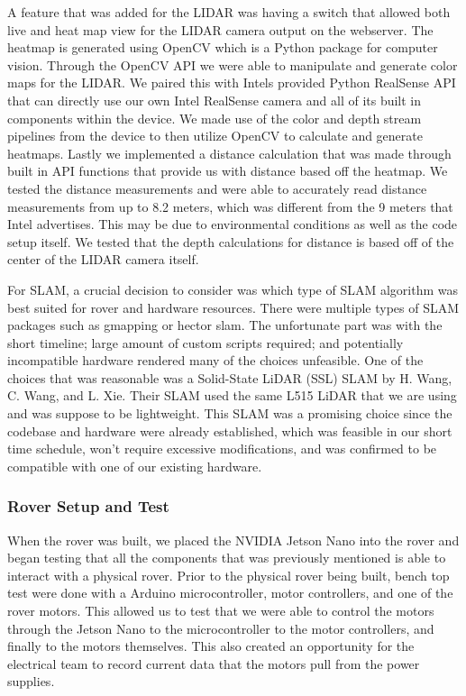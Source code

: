 \documentclass[a4paper, 10pt]{article}
\begin{document}
    A feature that was added for the LIDAR was having a switch that allowed both live and heat map view for the LIDAR camera output on the webserver. The heatmap is generated using OpenCV which is a Python package for computer vision. Through the OpenCV API we were able to manipulate and generate color maps for the LIDAR. We paired this with Intels provided Python RealSense API that can directly use our own Intel RealSense camera and all of its built in components within the device. We made use of the color and depth stream pipelines from the device to then utilize OpenCV to calculate and generate heatmaps. 
    Lastly we implemented a distance calculation that was made through built in API functions that provide us with distance based off the heatmap. 
    We tested the distance measurements and were able to accurately read distance measurements from up to 8.2 meters, which was different from the 9 meters that Intel advertises. This may be due to environmental conditions as well as the code setup itself. We tested that the depth calculations for distance is based off of the center of the LIDAR camera itself.
    
    For SLAM, a crucial decision to consider was which type of SLAM algorithm was best suited for rover and hardware resources. There were multiple types of SLAM packages such as gmapping or hector slam. The unfortunate part was with the short timeline; large amount of custom scripts required; and potentially incompatible hardware rendered many of the choices unfeasible. One of the choices that was reasonable was a Solid-State LiDAR (SSL) SLAM by H. Wang, C. Wang, and L. Xie. Their SLAM used the same L515 LiDAR that we are using and was suppose to be lightweight. This SLAM was a promising choice since the codebase and hardware were already established, which was feasible in our short time schedule, won't require excessive modifications, and was confirmed to be compatible with one of our existing hardware. 

    \subsubsection*{Rover Setup and Test}
    When the rover was built, we placed the NVIDIA Jetson Nano into the rover and began testing that all the components that was previously mentioned is able to interact with a physical rover. Prior to the physical rover being built, bench top test were done with a Arduino microcontroller, motor controllers, and one of the rover motors. This allowed us to test that we were able to control the motors through the Jetson Nano to the microcontroller to the motor controllers, and finally to the motors themselves. This also created an opportunity for the electrical team to record current data that the motors pull from the power supplies. 
\end{document}
